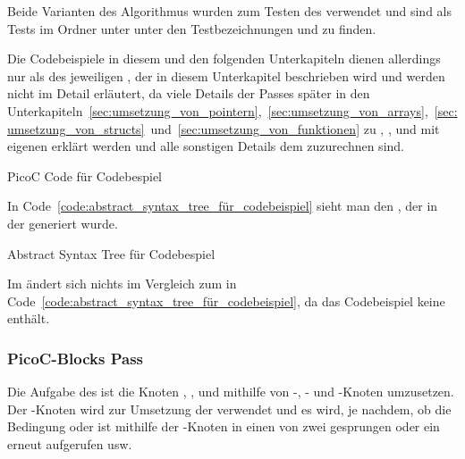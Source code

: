 Beide Varianten des Algorithmus wurden zum Testen des  verwendet und sind als Tests im Ordner  unter  unter den Testbezeichnungen  und  zu finden.

Die Codebeispiele in diesem und den folgenden Unterkapiteln dienen allerdings nur als  des jeweiligen , der in diesem Unterkapitel beschrieben wird und werden nicht im Detail erläutert, da viele Details der Passes später in den Unterkapiteln~\ref{sec:umsetzung_von_pointern},~\ref{sec:umsetzung_von_arrays},~\ref{sec:umsetzung_von_structs}~und~\ref{sec:umsetzung_von_funktionen} zu ,  ,  und  mit eigenen  erklärt werden und alle sonstigen Details dem  zuzurechnen sind.

\begin{code}
  \centering
  \caption{PicoC Code für Codebespiel}
  \label{code:picoc_code_für_codebeispiel}
\end{code}

In Code~\ref{code:abstract_syntax_tree_für_codebeispiel} sieht man den , der in der  generiert wurde.

\begin{code}
  \centering
  \caption{Abstract Syntax Tree für Codebespiel}
  \label{code:abstract_syntax_tree_für_codebeispiel}
\end{code}

Im  ändert sich nichts im Vergleich zum  in Code~\ref{code:abstract_syntax_tree_für_codebeispiel}, da das Codebeispiel keine  enthält.

\subsubsection{PicoC-Blocks Pass}
\label{picoc_blocks_pass}
\label{sec:picoc_blocks_pass_zweck}

Die Aufgabe des  ist die Knoten , ,  und  mithilfe von -, - und -Knoten umzusetzen. Der -Knoten wird zur Umsetzung der  verwendet und es wird, je nachdem, ob die Bedingung  oder  ist mithilfe der -Knoten in einen von zwei  gesprungen oder ein  erneut aufgerufen usw.


